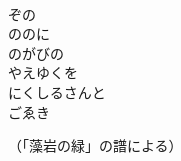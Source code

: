 \documentclass[10pt,b5j]{tarticle} %
\begin{document}
\begin{enumerate}
\begin{minipage}[c]{\blocksize}
        \vspace{\linespace}
        \item~\\
        ぞの\\
        ののに\\
        のがびの\\
        やえゆくを\\
        にくしるさんと\\
        ごゑき
        
    \end{minipage}
\end{enumerate} %

\begin{flushright}
    （「藻岩の緑」の譜による）
\end{flushright}
    
\end{document}
